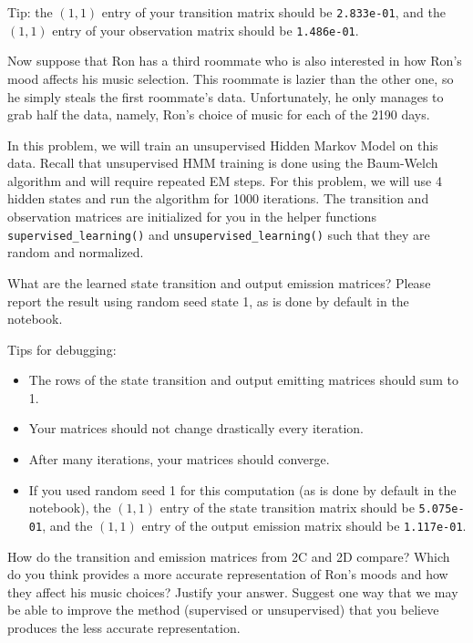 Tip: the \((1,1)\) entry of your transition matrix should be \verb|2.833e-01|, and the \((1,1)\) entry of your observation matrix should be \verb|1.486e-01|.
\begin{solution}
\end{solution}
\indent\problem[15] %
Now suppose that Ron has a third roommate who is also interested in how Ron's mood affects his music selection. This roommate is lazier than the other one, so he simply steals the first roommate's data. Unfortunately, he only manages to grab half the data, namely, Ron's choice of music for each of the 2190 days.

In this problem, we will train an unsupervised Hidden Markov Model on this data. Recall that unsupervised HMM training is done using the Baum-Welch algorithm and will require repeated EM steps. For this problem, we will use 4 hidden states and run the algorithm for 1000 iterations. The transition and observation matrices are initialized for you in the helper functions \texttt{supervised\_learning()} and \texttt{unsupervised\_learning()} such that they are random and normalized.

What are the learned state transition and output emission matrices? Please report the result using random seed state 1, as is done by default in the notebook.

Tips for debugging:
\begin{itemize}
  \item The rows of the state transition and output emitting matrices should sum to 1.
  \item Your matrices should not change drastically every iteration.
  \item After many iterations, your matrices should converge.
  \item If you used random seed 1 for this computation (as is done by default in the notebook), the \((1,1)\) entry of the state transition matrix should be \verb|5.075e-01|, and the \((1,1)\) entry of the output emission matrix should be \verb|1.117e-01|.
\end{itemize}

\begin{solution}
\end{solution}

\problem[5] How do the transition and emission matrices from 2C and 2D compare? Which do you think provides a more accurate representation of Ron's moods and how they affect his music choices? Justify your answer. Suggest one way that we may be able to improve the method (supervised or unsupervised) that you believe produces the less accurate representation. 

